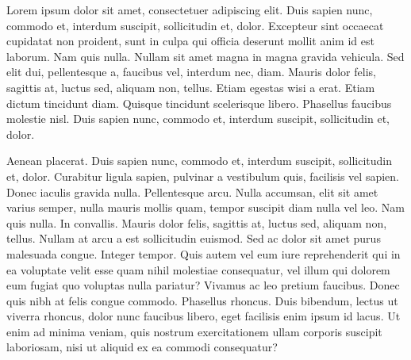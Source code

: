 Lorem ipsum dolor sit amet, consectetuer adipiscing elit. Duis sapien nunc,
commodo et, interdum suscipit, sollicitudin et, dolor. Excepteur sint occaecat
cupidatat non proident, sunt in culpa qui officia deserunt mollit anim id est
laborum. Nam quis nulla. Nullam sit amet magna in magna gravida vehicula. Sed
elit dui, pellentesque a, faucibus vel, interdum nec, diam. Mauris dolor felis,
sagittis at, luctus sed, aliquam non, tellus. Etiam egestas wisi a erat. Etiam
dictum tincidunt diam. Quisque tincidunt scelerisque libero. Phasellus faucibus
molestie nisl. Duis sapien nunc, commodo et, interdum suscipit, sollicitudin
et, dolor.

Aenean placerat. Duis sapien nunc, commodo et, interdum suscipit, sollicitudin
et, dolor. Curabitur ligula sapien, pulvinar a vestibulum quis, facilisis vel
sapien. Donec iaculis gravida nulla. Pellentesque arcu. Nulla accumsan, elit
sit amet varius semper, nulla mauris mollis quam, tempor suscipit diam nulla
vel leo. Nam quis nulla. In convallis. Mauris dolor felis, sagittis at, luctus
sed, aliquam non, tellus. Nullam at arcu a est sollicitudin euismod. Sed ac
dolor sit amet purus malesuada congue. Integer tempor. Quis autem vel eum iure
reprehenderit qui in ea voluptate velit esse quam nihil molestiae consequatur,
vel illum qui dolorem eum fugiat quo voluptas nulla pariatur? Vivamus ac leo
pretium faucibus. Donec quis nibh at felis congue commodo. Phasellus rhoncus.
Duis bibendum, lectus ut viverra rhoncus, dolor nunc faucibus libero, eget
facilisis enim ipsum id lacus. Ut enim ad minima veniam, quis nostrum
exercitationem ullam corporis suscipit laboriosam, nisi ut aliquid ex ea
commodi consequatur?
